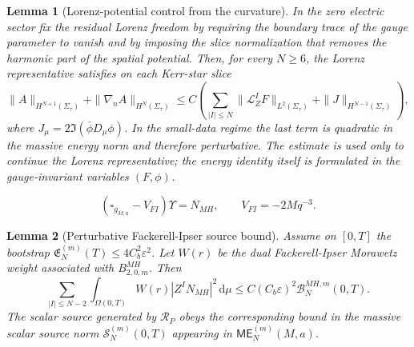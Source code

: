 \documentclass[10pt,a4paper]{amsart}
\newtheorem{lemma}{Lemma}
\newcommand{\ME}{\mathsf{ME}}
\newcommand{\dd}{\mathrm{d}}
\begin{document}
\begin{lemma}[Lorenz-potential control from the curvature]\label{lem:slow-lorenz-potential-control}
In the zero electric sector fix the residual Lorenz freedom by requiring the boundary trace of the gauge parameter to vanish and by imposing the slice normalization that removes the harmonic part of the spatial potential.  Then, for every \(N\ge6\), the Lorenz representative satisfies on each Kerr-star slice
\begin{equation}\label{eq:slow-potential-control}
 \|A\|_{H^{N+1}(\Sigma_\tau)}+
 \|\nabla_nA\|_{H^{N}(\Sigma_\tau)}
 \le C\left(
 \sum_{|I|\le N}\|\mathcal L_Z^IF\|_{L^2(\Sigma_\tau)}
 +\|J\|_{H^{N-1}(\Sigma_\tau)}
 \right),
\end{equation}
where \(J_\mu=2\Im(\bar\phi D_\mu\phi)\).  In the small-data regime the last term is quadratic in the massive energy norm and therefore perturbative.  The estimate is used only to continue the Lorenz representative; the energy identity itself is formulated in the gauge-invariant variables \((F,\phi)\).
\end{lemma}

\begin{equation}\label{eq:slow-fi-forced}
 (\square_{g_{M,a}}-V_{FI})\Upsilon=N_{MH},
 \qquad
 V_{FI}=-2Mq^{-3}.
\end{equation}

\begin{lemma}[Perturbative Fackerell-Ipser source bound]\label{lem:slow-FI-source-bound}
Assume on \([0,T]\) the bootstrap \(\mathfrak E_N^{(m)}(T)\le4C_b^2\varepsilon^2\).  Let \(W(r)\) be the dual Fackerell-Ipser Morawetz weight associated with \(B^{MH}_{2,0,m}\).  Then
\begin{equation}\label{eq:slow-FI-source-bound}
 \sum_{|I|\le N-2}\int_{\Omega(0,T)} W(r)|Z^IN_{MH}|^2\,\dd\mu
 \le C(C_b\varepsilon)^2\mathcal B_N^{MH,m}(0,T).
\end{equation}
The scalar source generated by \(\mathcal R_P\) obeys the corresponding bound in the massive scalar source norm \(\mathcal S_N^{(m)}(0,T)\) appearing in \(\ME_N^{(m)}(M,a)\).
\end{lemma}
\end{document}
